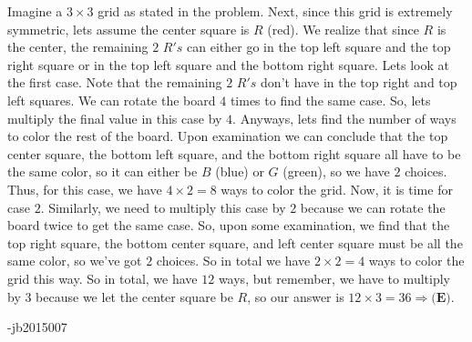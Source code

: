 \begin{enumerate}
Imagine a $3\times3$ grid as stated in the problem. Next, since this grid is extremely symmetric, lets assume the center square is $R$ (red). We realize that since $R$ is the center, the remaining $2$ $R's$ can either go in the top left square and the top right square or in the top left square and the bottom right square. Lets look at the first case. Note that the remaining $2$ $R's$ don't have in the top right and top left squares. We can rotate the board $4$ times to find the same case. So, lets multiply the final value in this case by $4$. Anyways, lets find the number of ways to color the rest of the board. Upon examination we can conclude that the top center square, the bottom left square, and the bottom right square all have to be the same color, so it can either be $B$ (blue) or $G$ (green), so we have $2$ choices. Thus, for this case, we have $4 \times 2 = 8$ ways to color the grid. Now, it is time for case $2$. Similarly, we need to multiply this case by $2$ because we can rotate the board twice to get the same case. So, upon some examination, we find that the top right square, the bottom center square, and left center square must be all the same color, so we've got $2$ choices. So in total we have $2\times2=4$ ways to color the grid this way. So in total, we have $12$ ways, but remember, we have to multiply by $3$ because we let the center square be $R$, so our answer is $12\times3=36 \Longrightarrow \boxed{\textbf{(E)}}$.

 -jb2015007

 


\end{enumerate}